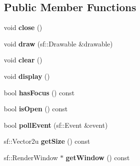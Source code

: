 \subsection*{Public Member Functions}
\begin{DoxyCompactItemize}
\item 
void {\bfseries close} ()\hypertarget{class_window_manager_a7beb014dcb85ded7a99819832e2da1fd}{}\label{class_window_manager_a7beb014dcb85ded7a99819832e2da1fd}

\item 
void {\bfseries draw} (sf\+::\+Drawable \&drawable)\hypertarget{class_window_manager_a30eb5e285d49fc0bc36c5ce3c999e314}{}\label{class_window_manager_a30eb5e285d49fc0bc36c5ce3c999e314}

\item 
void {\bfseries clear} ()\hypertarget{class_window_manager_a1537760f2513b8be4331e4b36dde4daa}{}\label{class_window_manager_a1537760f2513b8be4331e4b36dde4daa}

\item 
void {\bfseries display} ()\hypertarget{class_window_manager_aaf8cf1c0c6f6741024ffe2bf9c104271}{}\label{class_window_manager_aaf8cf1c0c6f6741024ffe2bf9c104271}

\item 
bool {\bfseries has\+Focus} () const \hypertarget{class_window_manager_a249482e2c0b6a8007fc0fb95a2da9fe1}{}\label{class_window_manager_a249482e2c0b6a8007fc0fb95a2da9fe1}

\item 
bool {\bfseries is\+Open} () const \hypertarget{class_window_manager_a1c939cffd1179d99b3f8187d05178025}{}\label{class_window_manager_a1c939cffd1179d99b3f8187d05178025}

\item 
bool {\bfseries poll\+Event} (sf\+::\+Event \&event)\hypertarget{class_window_manager_a12e8882e23550c97d19e84b48e671c03}{}\label{class_window_manager_a12e8882e23550c97d19e84b48e671c03}

\item 
sf\+::\+Vector2u {\bfseries get\+Size} () const \hypertarget{class_window_manager_add1e1732e70526531490696a1dd74e56}{}\label{class_window_manager_add1e1732e70526531490696a1dd74e56}

\item 
sf\+::\+Render\+Window $\ast$ {\bfseries get\+Window} () const \hypertarget{class_window_manager_a7d3a09a77e5a985dd87da13e3c096c83}{}\label{class_window_manager_a7d3a09a77e5a985dd87da13e3c096c83}


\end{DoxyCompactItemize}
